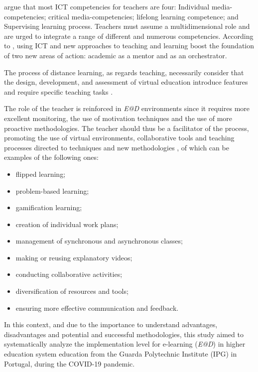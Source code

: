 \documentclass[english]{textolivre}
\begin{document}
\textcite{zwaneveld2007} argue that most ICT competencies for teachers are four: Individual media-competencies; critical media-competencies; lifelong learning competence; and Supervising learning process. Teachers must assume a multidimensional role and are urged to integrate a range of different and numerous competencies. According to \textcite{wake2007}, using ICT and new approaches to teaching and learning boost the foundation of two new areas of action: academic as a mentor and as an orchestrator.

The process of distance learning, as regards teaching, necessarily consider that the design, development, and assessment of virtual education introduce features and require specific teaching tasks \cite{major2010, spector2007}.

The role of the teacher is reinforced in \emph{E@D} environments since it requires more excellent monitoring, the use of motivation techniques and the use of more proactive methodologies. The teacher should thus be a facilitator of the process, promoting the use of virtual environments, collaborative tools and teaching processes directed to techniques and new methodologies \cite{dunlap2008, amitg2015}, of which can be examples of the following ones:

\begin{itemize}
    \item flipped learning;
    \item problem-based learning;
    \item gamification learning;
    \item creation of individual work plans;
    \item management of synchronous and asynchronous classes;
    \item making or reusing explanatory videos;
    \item conducting collaborative activities;
    \item diversification of resources and tools;
    \item ensuring more effective communication and feedback.
\end{itemize}

In this context, and due to the importance to understand advantages, disadvantages and potential and successful methodologies, this study aimed to systematically analyze the implementation level for e-learning (\emph{E@D}) in higher education system education from the Guarda Polytechnic Institute (IPG) in Portugal, during the COVID-19 pandemic.
\end{document}
